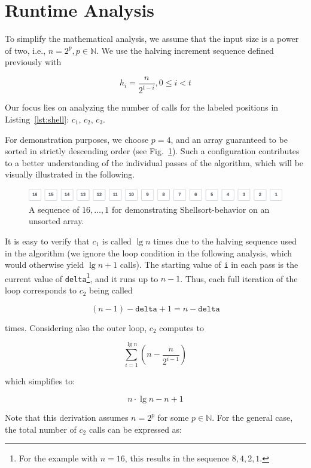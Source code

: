 \section{Runtime Analysis}

To simplify the mathematical analysis, we assume that the input size is a power of two, i.e., $n = 2^p, p \in \mathbb{N}$.
We use the halving increment sequence defined previously with

\[
    h_i = \frac{n}{2^{t-i}}, 0 \leq i < t
\]

\noindent
Our focus lies on analyzing the number of calls for the labeled positions in Listing~\ref{lst:shell}: $c_1$, $c_2$, $c_3$.

For demonstration purposes, we choose $p=4$, and an array guaranteed to be sorted in strictly descending order (see Fig.~\ref{fig:bestcase}).
Such a configuration contributes to a better understanding of the individual passes of the algorithm, which will be visually illustrated in the following.
\begin{figure}[!h]
    \centering
    \includegraphics[width=1\columnwidth]{img/bestcase-sequence}
    \caption{A sequence of $16, \ldots, 1$ for demonstrating Shellsort-behavior on an unsorted array.}
    \label{fig:bestcase}
\end{figure}
It is easy to verify that $c_1$ is called $\lg n$ times due to the halving sequence used in the algorithm (we ignore the loop condition in the following analysis, which would otherwise yield $\lg n + 1$ calls).
The starting value of \texttt{i} in each pass is the current value of \texttt{delta}\footnote{
For the example with $n = 16$, this results in the sequence $8, 4, 2, 1$.
}, and it runs up to $n - 1$.
Thus, each full iteration of the loop corresponds to $c_2$ being called

\[
(n - 1) - \texttt{delta} + 1 = n - \texttt{delta}
\]

\noindent
times.
Considering also the outer loop, $c_2$ computes to

\[
\sum_{i=1}^{\lg n} \left( n - \frac{n}{2^{i-1}} \right)
\]

\noindent
which simplifies to:

\[
n \cdot \lg n - n + 1
\]

\noindent
Note that this derivation assumes $n = 2^p$ for some $p \in \mathbb{N}$.
For the general case, the total number of $c_2$ calls can be expressed as:

